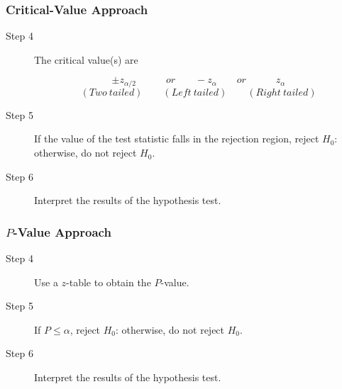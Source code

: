 \documentclass[12pt]{article}
\begin{document}
            \subsubsection*{Critical-Value Approach}
                \begin{description}
                    \item[Step 4] The critical value(s) are
                    \begin{center}
                        \[
                            \pm z_{\alpha/2} \quad\quad\quad or \quad\quad -z_{\alpha} \quad
                            \quad or \quad\quad\quad z_{\alpha}     
                        \]
                        \[
                            (Two \ tailed)\quad\quad(Left \ tailed)\quad
                            \quad(Right \ tailed)
                        \]
                    \end{center}
                    \item[Step 5] If the value of the test statistic falls in the rejection
                    region, reject $H_0$: otherwise, do not reject $H_0$.
                    \item[Step 6] Interpret the results of the hypothesis test.
                \end{description}
            \subsubsection*{$P$-Value Approach}
                \begin{description}
                    \item[Step 4] Use a $z$-table to obtain the $P$-value.
                    \item[Step 5] If $P \leq \alpha$, reject $H_0$: otherwise, do not reject
                    $H_0$.
                    \item[Step 6] Interpret the results of the hypothesis test.
                \end{description}
\end{document}
